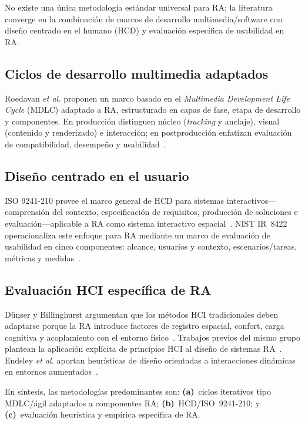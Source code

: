 \documentclass[conference]{IEEEtran}
\begin{document}
No existe una \'unica metodolog\'ia est\'andar universal para RA; la literatura converge en la combinaci\'on de marcos de desarrollo multimedia/software con dise\~no centrado en el humano (HCD) y evaluaci\'on espec\'ifica de usabilidad en RA.

\subsection{Ciclos de desarrollo multimedia adaptados}
Roedavan \textit{et al.} proponen un marco basado en el \emph{Multimedia Development Life Cycle} (MDLC) adaptado a RA, estructurado en capas de fase, etapa de desarrollo y componentes. En producci\'on distinguen n\'ucleo (\emph{tracking} y anclaje), visual (contenido y renderizado) e interacci\'on; en postproducci\'on enfatizan evaluaci\'on de compatibilidad, desempe\~no y usabilidad~\cite{roedavan2025mdlc}.

\subsection{Dise\~no centrado en el usuario}
ISO 9241-210 provee el marco general de HCD para sistemas interactivos---comprensi\'on del contexto, especificaci\'on de requisitos, producci\'on de soluciones e evaluaci\'on---aplicable a RA como sistema interactivo espacial~\cite{iso9241_210}. NIST IR~8422 operacionaliza este enfoque para RA mediante un marco de evaluaci\'on de usabilidad en cinco componentes: alcance, usuarios y contexto, escenarios/tareas, m\'etricas y medidas~\cite{nist2022ar}.

\subsection{Evaluaci\'on HCI espec\'ifica de RA}
D\"unser y Billinghurst argumentan que los m\'etodos HCI tradicionales deben adaptarse porque la RA introduce factores de registro espacial, confort, carga cognitiva y acoplamiento con el entorno f\'isico~\cite{dunser2011evaluating}. Trabajos previos del mismo grupo plantean la aplicaci\'on expl\'icita de principios HCI al dise\~no de sistemas RA~\cite{dunser2007hci}. Endsley \textit{et al.} aportan heur\'isticas de dise\~no orientadas a interacciones din\'amicas en entornos aumentados~\cite{endsley2017heuristics}.

En s\'intesis, las metodolog\'ias predominantes son: \textbf{(a)}~ciclos iterativos tipo MDLC/\'agil adaptados a componentes RA; \textbf{(b)}~HCD/ISO~9241-210; y \textbf{(c)}~evaluaci\'on heur\'istica y emp\'irica espec\'ifica de RA.
\end{document}
